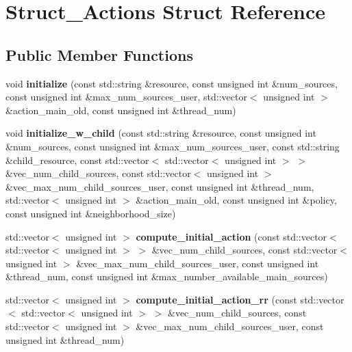 \hypertarget{structStruct__Actions}{\section{Struct\-\_\-\-Actions Struct Reference}
\label{structStruct__Actions}
}
\subsection*{Public Member Functions}
\begin{DoxyCompactItemize}
\item 
\hypertarget{structStruct__Actions_ad28379afcba301fca72e1e6939fa4c4f}{void {\bfseries initialize} (const std\-::string \&resource, const unsigned int \&num\-\_\-sources, const unsigned int \&max\-\_\-num\-\_\-sources\-\_\-user, std\-::vector$<$ unsigned int $>$ \&action\-\_\-main\-\_\-old, const unsigned int \&thread\-\_\-num)}\label{structStruct__Actions_ad28379afcba301fca72e1e6939fa4c4f}

\item 
\hypertarget{structStruct__Actions_a65aec6da3f4aa08047e285566fe45487}{void {\bfseries initialize\-\_\-w\-\_\-child} (const std\-::string \&resource, const unsigned int \&num\-\_\-sources, const unsigned int \&max\-\_\-num\-\_\-sources\-\_\-user, const std\-::string \&child\-\_\-resource, const std\-::vector$<$ std\-::vector$<$ unsigned int $>$ $>$ \&vec\-\_\-num\-\_\-child\-\_\-sources, const std\-::vector$<$ unsigned int $>$ \&vec\-\_\-max\-\_\-num\-\_\-child\-\_\-sources\-\_\-user, const unsigned int \&thread\-\_\-num, std\-::vector$<$ unsigned int $>$ \&action\-\_\-main\-\_\-old, const unsigned int \&policy, const unsigned int \&neighborhood\-\_\-size)}\label{structStruct__Actions_a65aec6da3f4aa08047e285566fe45487}

\item 
\hypertarget{structStruct__Actions_a2d1d697fe7778e807179b7bef8c809db}{std\-::vector$<$ unsigned int $>$ {\bfseries compute\-\_\-initial\-\_\-action} (const std\-::vector$<$ std\-::vector$<$ unsigned int $>$ $>$ \&vec\-\_\-num\-\_\-child\-\_\-sources, const std\-::vector$<$ unsigned int $>$ \&vec\-\_\-max\-\_\-num\-\_\-child\-\_\-sources\-\_\-user, const unsigned int \&thread\-\_\-num, const unsigned int \&max\-\_\-number\-\_\-available\-\_\-main\-\_\-sources)}\label{structStruct__Actions_a2d1d697fe7778e807179b7bef8c809db}

\item 
\hypertarget{structStruct__Actions_a41346a1cddc836c0fcf0509debb5bcd6}{std\-::vector$<$ unsigned int $>$ {\bfseries compute\-\_\-initial\-\_\-action\-\_\-rr} (const std\-::vector$<$ std\-::vector$<$ unsigned int $>$ $>$ \&vec\-\_\-num\-\_\-child\-\_\-sources, const std\-::vector$<$ unsigned int $>$ \&vec\-\_\-max\-\_\-num\-\_\-child\-\_\-sources\-\_\-user, const unsigned int \&thread\-\_\-num)}\label{structStruct__Actions_a41346a1cddc836c0fcf0509debb5bcd6}

\end{DoxyCompactItemize}
